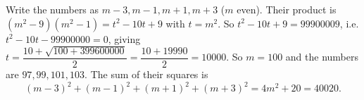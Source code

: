 Write the numbers as $m-3,m-1,m+1,m+3$ ($m$ even). Their product is $\left(m^2-9\right)\left(m^2-1\right)=t^2-10t+9$ with $t=m^2$. So $t^2-10t+9=99900009$, i.e. $t^2-10t-99900000=0$, giving $t=\dfrac{10+\sqrt{100+399600000}}{2}=\dfrac{10+19990}{2}=10000$. So $m=100$ and the numbers are $97,99,101,103$. The sum of their squares is
\[(m-3)^2+(m-1)^2+(m+1)^2+(m+3)^2=4m^2+20=\boxed{40020}.\]
